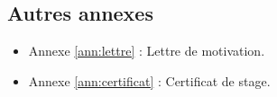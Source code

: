 \documentclass[oneside]{book}
\begin{document}
\begin{appendices}

\newpage

\chapter{Autres annexes}
\begin{itemize}
\item Annexe \ref{ann:lettre} : Lettre de motivation.
\item Annexe \ref{ann:certificat} : Certificat de stage.
\end{itemize}



\newpage




\end{appendices}
\end{document}

